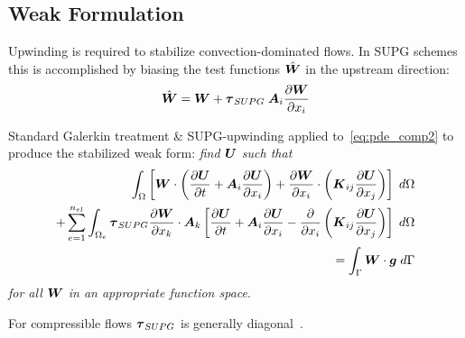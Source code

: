 \documentclass[compress,11pt]{beamer}
\begin{document}
\subsection{Weak Formulation}
\frame
{
  \vspace{-1.5em}
  \small
  Upwinding is required to stabilize convection-dominated flows. In SUPG schemes this is accomplished by biasing the test functions $\hat{{\boldsymbol{W}}}$ in the upstream direction:
  \begin{equation}
     \hat{{\boldsymbol{W}}} = {\boldsymbol{W}} + {\boldsymbol{\tau}}_{SUPG}\;{\boldsymbol{A}}_i{\frac{\partial{{\boldsymbol{W}}}}{\partial{x_i}}}
  \end{equation}
   {
   	Standard Galerkin treatment \& SUPG-upwinding applied to~\eqref{eq:pde_comp2} to produce the stabilized weak form: \emph{find ${\boldsymbol{U}}$ such that}
   	\begin{eqnarray}
   	  \label{eq:comp_weak_SUPG}
   	  \int_\Omega  \left[ {\boldsymbol{W}}\cdot\left({\frac{\partial{{\boldsymbol{U}}}}{\partial{t}}} + {\boldsymbol{A}}_i {\frac{\partial{{\boldsymbol{U}}}}{\partial{x_i}}} \right) + {\frac{\partial{{\boldsymbol{W}}}}{\partial{x_i}}} \cdot \left( {\boldsymbol{K}}_{ij} {\frac{\partial{{\boldsymbol{U}}}}{\partial{x_j}}} \right) \right] \; d\Omega \nonumber \\
   	  + \sum_{e=1}^{n_{el}} \int_{\Omega_e} {\boldsymbol{\tau}}_{SUPG} {\frac{\partial{{\boldsymbol{W}}}}{\partial{x_k}}}\cdot{\boldsymbol{A}}_k
   	  \left[ {\frac{\partial{{\boldsymbol{U}}}}{\partial{t}}} + {\boldsymbol{A}}_i {\frac{\partial{{\boldsymbol{U}}}}{\partial{x_i}}} - {\frac{\partial{}}{\partial{x_i}}} \left( {\boldsymbol{K}}_{ij} {\frac{\partial{{\boldsymbol{U}}}}{\partial{x_j}}} \right) \right] \; d\Omega  \nonumber \\
   	  = \int_\Gamma {\boldsymbol{W}}\cdot{\boldsymbol{g}} \; d\Gamma
   	\end{eqnarray}
   	\emph{for all ${\boldsymbol{W}}$ in an appropriate function space}.
   	\vspace{.5em}
  
   	For compressible flows ${\boldsymbol{\tau}}_{SUPG}$ is generally diagonal~\cite{hauke_hughes_compressible_variables}.
   }
}
\end{document}
